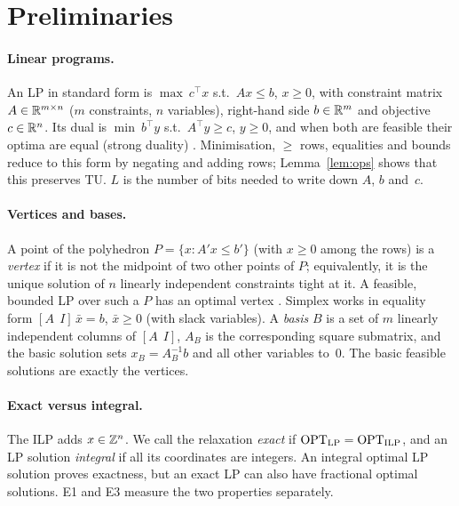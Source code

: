 \section{Preliminaries}\label{sec:prelim}

\paragraph{Linear programs.} An LP in standard form is $\max\ c^\top x$ s.t.\ $Ax \le b$, $x \ge 0$, with constraint matrix $A\in\mathbb{R}^{m\times n}$ ($m$ constraints, $n$ variables), right-hand side $b\in\mathbb{R}^m$ and objective $c\in\mathbb{R}^n$. Its dual is $\min\ b^\top y$ s.t.\ $A^\top y \ge c$, $y \ge 0$, and when both are feasible their optima are equal (strong duality) \cite{bertsimas1997}. Minimisation, $\ge$ rows, equalities and bounds reduce to this form by negating and adding rows; Lemma~\ref{lem:ops} shows that this preserves TU. $L$ is the number of bits needed to write down $A$, $b$ and~$c$.

\paragraph{Vertices and bases.} A point of the polyhedron $P=\{x : A'x\le b'\}$ (with $x\ge 0$ among the rows) is a \emph{vertex} if it is not the midpoint of two other points of $P$; equivalently, it is the unique solution of $n$ linearly independent constraints tight at it. A feasible, bounded LP over such a $P$ has an optimal vertex \cite{bertsimas1997}. Simplex works in equality form $[A\ \ I]\,\bar x = b$, $\bar x\ge 0$ (with slack variables). A \emph{basis} $B$ is a set of $m$ linearly independent columns of $[A\ \ I]$, $A_B$ is the corresponding square submatrix, and the basic solution sets $x_B = A_B^{-1}b$ and all other variables to~$0$. The basic feasible solutions are exactly the vertices.

\paragraph{Exact versus integral.} The ILP adds $x\in\mathbb{Z}^n$. We call the relaxation \emph{exact} if $\mathrm{OPT}_{\mathrm{LP}} = \mathrm{OPT}_{\mathrm{ILP}}$, and an LP solution \emph{integral} if all its coordinates are integers. An integral optimal LP solution proves exactness, but an exact LP can also have fractional optimal solutions. E1 and E3 measure the two properties separately.

